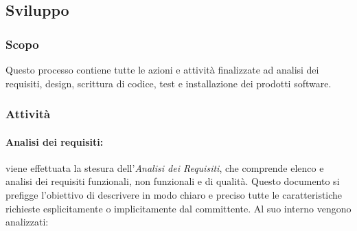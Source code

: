 \subsection{Sviluppo}
\subsubsection{Scopo} Questo processo contiene tutte le azioni e attività finalizzate ad analisi dei requisiti, design, scrittura di codice, test e installazione dei prodotti software\glo \:.
\subsubsection{Attività}
\paragraph{Analisi dei requisiti:} viene effettuata la stesura dell'\textit{Analisi dei Requisiti}, che comprende elenco e analisi dei requisiti funzionali, non funzionali e di qualità. Questo documento si prefigge l'obiettivo di descrivere in modo chiaro e preciso tutte le caratteristiche richieste esplicitamente o implicitamente dal committente.
    Al suo interno vengono analizzati:
